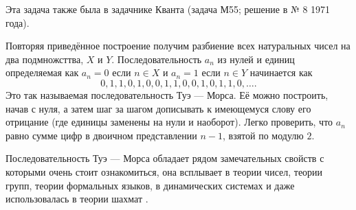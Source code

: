 \begin{addedbytheeditors}
Эта задача также была в задачнике Кванта (задача М55; решение в № 8 1971 года).

Повторяя приведённое построение получим разбиение всех натуральных чисел на два подмножсттва, $X$ и $Y$.
Последовательность $a_n$ из нулей и единиц определяемая как $a_n=0$ если $n\in X$ и $a_n=1$ если $n\in Y$ начинается как
 \[0,1,1,0,1,0,0,1,1,0,0,1,0,1,1,0,\ldots.\]
Это так называемая последовательность Туэ --- Морса.
Её можно построить, начав с нуля, а затем шаг за шагом дописывать к имеющемуся слову его отрицание (где единицы заменены на нули и наоборот).
Легко проверить, что $a_n$ равно сумме цифр в двоичном представлении $n-1$, взятой по модулю $2$.

Последовательность Туэ --- Морса обладает рядом замечательных свойств с которыми очень стоит ознакомиться, она всплывает в теории чисел, теории групп, теории формальных языков, в динамических системах и даже использовалась в теории шахмат \cite[Глава 1]{salomaa}.



\end{addedbytheeditors}

